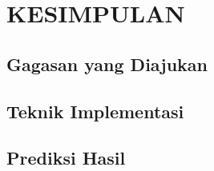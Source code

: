 \section{KESIMPULAN}

\subsection{Gagasan yang Diajukan}

\subsection{Teknik Implementasi}

\subsection{Prediksi Hasil}

\newpage
